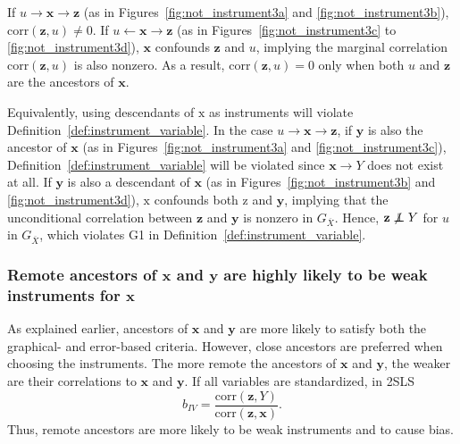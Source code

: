 \documentclass[11pt,review,authoryear]{elsarticle}
\begin{document}
If $u \rightarrow \mathbf{x} \rightarrow \mathbf{z}$ (as in Figures~\ref{fig:not_instrument3a} and \ref{fig:not_instrument3b}), $\mathrm{corr} \left( \mathbf{z}, u \right) \neq 0$. If $u \leftarrow \mathbf{x} \rightarrow \mathbf{z}$ (as in Figures~\ref{fig:not_instrument3c} to \ref{fig:not_instrument3d}), $\mathbf{x}$ confounds $\mathbf{z}$ and $u$, implying the marginal correlation $\mathrm{corr} \left( \mathbf{z}, u \right)$ is also nonzero. As a result, $\mathrm{corr} \left( \mathbf{z}, u \right) = 0$ only when both $u$ and $\mathbf{z}$ are the ancestors of $\mathbf{x}$.

Equivalently, using descendants of $\mathrm{x}$ as instruments will violate Definition~\ref{def:instrument_variable}. In the case $u \rightarrow \mathbf{x} \rightarrow \mathbf{z}$, if $\mathbf{y}$ is also the ancestor of $\mathbf{x}$ (as in Figures~\ref{fig:not_instrument3a} and \ref{fig:not_instrument3c}), Definition~\ref{def:instrument_variable} will be violated since $\mathbf{x} \rightarrow Y$ does not exist at all. If $\mathbf{y}$ is also a descendant of $\mathbf{x}$ (as in Figures~\ref{fig:not_instrument3b} and \ref{fig:not_instrument3d}), $\mathrm{x}$ confounds both $\mathrm{z}$ and $\mathbf{y}$, implying that the unconditional correlation between $\mathbf{z}$ and $\mathbf{y}$ is nonzero in $G_{\overline{X}}$. Hence, $\mathbf{z} \not\perp\!\!\!\!\perp Y$ for $u$ in $G_{\overline{X}}$, which violates G1 in Definition~\ref{def:instrument_variable}.

\subsubsection*{Remote ancestors of $\mathbf{x}$ and $\mathbf{y}$ are highly likely to be weak instruments for $\mathbf{x}$}

As explained earlier, ancestors of $\mathbf{x}$ and $\mathbf{y}$ are more likely to satisfy both the graphical- and error-based criteria. However, close ancestors are preferred when choosing the instruments. The more remote the ancestors of $\mathbf{x}$ and $\mathbf{y}$, the weaker are their correlations to $\mathbf{x}$ and $\mathbf{y}$. If all variables are standardized, in 2SLS
%
\[
  b_{IV} = \frac{\mathrm{corr} \left(\mathbf{z}, Y\right)}{\mathrm{corr} \left(\mathbf{z}, \mathbf{x}\right)}.
\]
%
Thus, remote ancestors are more likely to be weak instruments and to cause bias.

\newpage

%
%

%
\end{document}
